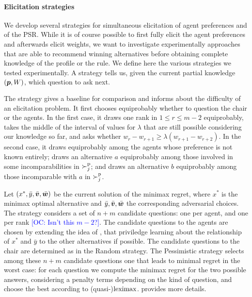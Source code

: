 \documentclass{article}
\newcommand{\commentOC}[1]{\textcolor{blue}{\small$\big[$OC: #1$\big]$}}
\begin{document}
\paragraph{Elicitation strategies}
We develop several strategies for simultaneous elicitation of agent preferences and of the PSR.
While it is of course possible to first fully elicit the agent preferences and afterwards elicit weights, we want to investigate experimentally approaches that are able to recommend winning alternatives before obtaining complete knowledge of the profile or the rule.
We define here the various strategies we tested experimentally. A strategy tells us, given the current partial knowledge $({\bm{p}}, W)$, which question to ask next.

The  strategy gives a baseline for comparison and informs about the difficulty of an elicitation problem. 
It first chooses equiprobably whether to question the chair or the agents. In the first case, it draws one rank in $1 ≤ r ≤ m-2$ equiprobably, takes the middle of the interval of values for $\lambda$ that are still possible considering our knowledge so far, and asks whether $w_r - w_{r+1} ≥ \lambda (w_{r+1} - w_{r+2})$.
In the second case, it draws equiprobably among the agents whose preference is not known entirely; draws an alternative $a$ equiprobably among those involved in some incomparabilities in $\succ^\text{p}_j$; and draws an alternative $b$ equiprobably among those incomparable with $a$ in $\succ^\text{p}_j$.

Let $(x^{*},\bar{y}, \bar{\bm{v}}, \bar{\bm{w}})$ be the current solution of the minimax regret, where $x^{*}$ is the minimax optimal alternative and $\bar{y}, \bar{\bm{v}}, \bar{\bm{w}}$ the corresponding adversarial choices. 
The  strategy considers a set of $n + m$ candidate questions: one per agent, and one per rank \commentOC{Isn’t this $m-2$?}.
The candidate questions to the agents are chosen by extending the idea of \citet{Lu2011}, that priviledge learning about the relationship of $x^*$ and $\bar{y}$ to the other alternatives if possible.
The candidate questions to the chair are determined as in the Random strategy.
The Pessimistic strategy selects among these $n + m$ candidate questions one that leads to minimal regret in the worst case: for each question we compute the minimax regret for the two possible answers, considering a penalty terms depending on the kind of question, and choose the best according to (quasi-)$\operatorname{leximax}$.  provides more details.
\end{document}
